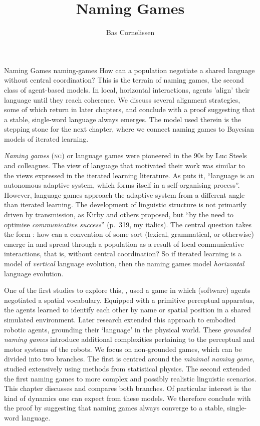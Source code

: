 \documentclass{../src/bcthesispart}
\title{Naming Games}
\author{Bas Cornelissen}
\begin{document}
%
	{Naming Games}%
	{naming-games}{%
	How can a population negotiate a shared language without central coordination?
	This is the terrain of naming games, the second class of agent-based models. 
	In local, horizontal interactions, agents 'align' their language until they reach coherence.
	We discuss several alignment strategies, some of which return in later chapters, and conclude with a proof suggesting that a stable, single-word language always emerges.
	The model used therein is the stepping stone for the next chapter, where we connect naming games to Bayesian models of iterated learning.
	}


\noindent
\emph{Naming games} (\textsc{ng}) or language games were pioneered in the 90s by Luc Steels and colleagues.
The view of language that motivated their work was similar to the views expressed in the iterated learning literature.
As \textcite{Steels1995} puts it, “language is an autonomous adaptive system, which forms itself in a self-organising process”.
However, language games approach the adaptive system from a different angle than iterated learning.
The development of linguistic structure is not primarily driven by transmission, as Kirby and others proposed, but “by the need to optimise \emph{communicative success}” (p.~319, my italics).
The central question takes the form \parencite{Steels2011}: how can a convention of some sort (lexical, grammatical, or otherwise) emerge in and spread through a population as a result of local communicative interactions, that is, without central coordination?
So if iterated learning is a model of \emph{vertical} language evolution, then the naming games model \emph{horizontal} language evolution.




One of the first studies to explore this, \textcite{Steels1995}, used a game in which (software) agents negotiated a spatial vocabulary.
Equipped with a primitive perceptual apparatus, the agents learned to identify each other by name or spatial position in a shared simulated environment.
Later research extended this approach to embodied robotic agents, grounding their ‘language’ in the physical world.
These \emph{grounded naming games} \parencite{Steels2012,Steels2015} introduce additional complexities pertaining to the perceptual and motor systems of the robots.
We focus on non-grounded games, which can be divided into two branches.
The first is centred around the \emph{minimal naming game}, studied extensively using methods from statistical physics.
The second extended the first naming games to more complex and possibly realistic linguistic scenarios.
This chapter discusses and compares both branches.
Of particular interest is the kind of dynamics one can expect from these models.
We therefore conclude with the proof by \textcite{DeVylder2006} suggesting that naming games always converge to a stable, single-word language.
\end{document}
